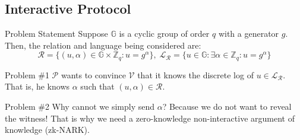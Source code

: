 \documentclass[xcolor={usenames,dvipsnames}]{beamer}
\begin{document}
    \subsection{Interactive Protocol}
    \begin{frame}{Problem Statement}
        Suppose $\mathbb{G}$ is a cyclic group of order $q$ with a generator $g$. Then, the relation and language being considered are:
        \begin{equation*}
            \mathcal{R} = \{(u, \alpha) \in \mathbb{G} \times \mathbb{Z}_q: u = g^{\alpha}\}, \; \mathcal{L}_{\mathcal{R}} = \{u \in \mathbb{G}: \exists \alpha \in \mathbb{Z}_q: u = g^{\alpha}\}
        \end{equation*}

        \begin{block}{Problem \#1}
            $\mathcal{P}$ wants to convince $\mathcal{V}$ that it knows the discrete log of $u \in \mathcal{L}_{\mathcal{R}}$. That is, he knows $\alpha$ such that $(u,\alpha) \in \mathcal{R}$.
        \end{block}

        \begin{block}{Problem \#2}
            Why cannot we simply send $\alpha$? Because we do not want to reveal the witness! That is why we need a zero-knowledge non-interactive argument of knowledge (zk-NARK).
        \end{block}
    \end{frame}
\end{document}
